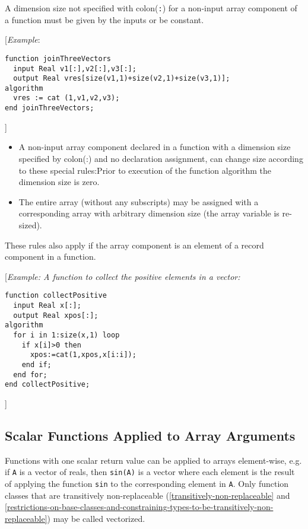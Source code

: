 A dimension size not specified with colon(\lstinline!:!) for a non-input array
component of a function must be given by the inputs or be constant.

{[}\emph{Example}:

\begin{lstlisting}[language=modelica]
function joinThreeVectors
  input Real v1[:],v2[:],v3[:];
  output Real vres[size(v1,1)+size(v2,1)+size(v3,1)];
algorithm
  vres := cat (1,v1,v2,v3);
end joinThreeVectors;
\end{lstlisting}
{]}

\begin{itemize}
\item
  A non-input array component declared in a function with a dimension
  size specified by colon(:) and no declaration assignment, can change
  size according to these special rules:Prior to execution of the
  function algorithm the dimension size is zero.
\item
  The entire array (without any subscripts) may be assigned with a
  corresponding array with arbitrary dimension size (the array variable
  is re-sized).
\end{itemize}

These rules also apply if the array component is an element of a record
component in a function.

{[}\emph{Example: A function to collect the positive elements in a
vector:}

\begin{lstlisting}[language=modelica]
function collectPositive
  input Real x[:];
  output Real xpos[:];
algorithm
  for i in 1:size(x,1) loop
    if x[i]>0 then
      xpos:=cat(1,xpos,x[i:i]);
    end if;
  end for;
end collectPositive;
\end{lstlisting}
{]}

\subsection{Scalar Functions Applied to Array Arguments}

Functions with one scalar return value can be applied to arrays
element-wise, e.g. if \lstinline!A! is a vector of reals, then \lstinline!sin(A)! is a vector
where each element is the result of applying the function \lstinline!sin! to the
corresponding element in \lstinline!A!. Only function classes that are transitively
non-replaceable (\autoref{transitively-non-replaceable} and \autoref{restrictions-on-base-classes-and-constraining-types-to-be-transitively-non-replaceable}) may be called vectorized.

